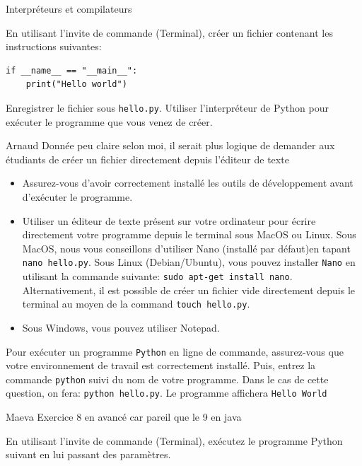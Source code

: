 \begin{section}{Interpréteurs et compilateurs}
\begin{Exercice}[10 minutes]
        En utilisant l'invite de commande (Terminal), créer un fichier contenant les instructions suivantes:
        \begin{lstlisting}
if __name__ == "__main__":
    print("Hello world")
        \end{lstlisting}
        Enregistrer le fichier sous \lstinline{hello.py}. Utiliser l'interpréteur de Python pour exécuter le programme que vous venez de créer.
    \end{Exercice}
    \begin{note}{Arnaud}
    Donnée peu claire selon moi, il serait plus logique de demander aux étudiants de créer un fichier directement depuis l'éditeur de texte
    \end{note}
    \begin{conseil}
        \begin{itemize}
            \item Assurez-vous d'avoir correctement installé les outils de développement avant d'exécuter le programme.
            \item Utiliser un éditeur de texte présent sur votre ordinateur pour écrire directement votre programme depuis le terminal sous MacOS ou Linux. Sous MacOS, nous vous conseillons d'utiliser Nano (installé par défaut)en tapant \lstinline{nano hello.py}. Sous Linux (Debian/Ubuntu), vous pouvez installer \lstinline{Nano} en utilisant la commande suivante: \lstinline{sudo apt-get install nano}.
Alternativement, il est possible de créer un fichier vide directement depuis le terminal au moyen de la command \lstinline{touch hello.py}.
            \item Sous Windows, vous pouvez utiliser Notepad. 
        \end{itemize}
    \end{conseil}
    \begin{solution}
        Pour exécuter un programme \lstinline{Python} en ligne de commande, assurez-vous que votre environnement de travail est correctement installé. Puis, entrez la commande \lstinline{python} suivi du nom de votre programme. 
        Dans le cas de cette question, on fera: \lstinline{python hello.py}.
        Le programme affichera \lstinline{Hello World}
    \end{solution}
    
    \begin{note}{Maeva}
    Exercice 8 en avancé car pareil que le 9 en java 
\end{note}
    \begin{Exercice}[10 minutes]
        En utilisant l'invite de commande (Terminal), exécutez le programme Python suivant en lui passant des paramètres.


\end{Exercice}
\end{section}
